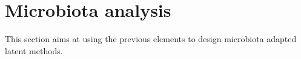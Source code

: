 \section{Microbiota analysis}

This section aims at using the previous elements to design microbiota adapted latent methods.